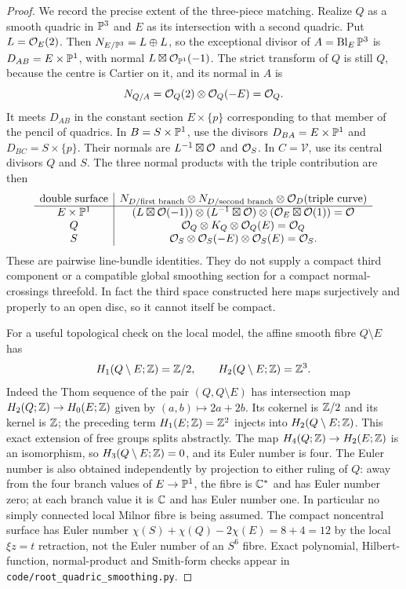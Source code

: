 \begin{proof}
We record the precise extent of the three-piece matching.
Realize $Q$ as a smooth quadric in $\mathbb P^3$ and $E$ as its
intersection with a second quadric.  Put $L=\mathcal O_E(2)$.
Then $N_{E/\mathbb P^3}=L\oplus L$, so the exceptional divisor
of $A=\operatorname{Bl}_E\mathbb P^3$ is
$D_{AB}=E\times\mathbb P^1$, with normal
$L\boxtimes\mathcal O_{\mathbb P^1}(-1)$.
The strict transform of $Q$ is still $Q$, because the centre is
Cartier on it, and its normal in $A$ is
\[
 N_{Q/A}=\mathcal O_Q(2)\otimes\mathcal O_Q(-E)=\mathcal O_Q.
\]
It meets $D_{AB}$ in the constant section $E\times\{p\}$
corresponding to that member of the pencil of quadrics.
In $B=S\times\mathbb P^1$, use the divisors
$D_{BA}=E\times\mathbb P^1$ and $D_{BC}=S\times\{p\}$.
Their normals are $L^{-1}\boxtimes\mathcal O$ and $\mathcal O_S$.
In $C=\mathcal V$, use its central divisors $Q$ and $S$.
The three normal products with the triple contribution are then
\[
\begin{array}{c|c}
 \text{double surface}&
 N_{D/\text{first branch}}\otimes
 N_{D/\text{second branch}}\otimes\mathcal O_D(\text{triple curve})\\ \hline
 E\times\mathbb P^1&
 (L\boxtimes\mathcal O(-1))\otimes(L^{-1}\boxtimes\mathcal O)
       \otimes(\mathcal O_E\boxtimes\mathcal O(1))=\mathcal O\\
 Q&\mathcal O_Q\otimes K_Q\otimes\mathcal O_Q(E)=\mathcal O_Q\\
 S&\mathcal O_S\otimes\mathcal O_S(-E)\otimes\mathcal O_S(E)=\mathcal O_S.
\end{array}
\]
These are pairwise line-bundle identities.  They do not supply
a compact third component or a compatible global smoothing
section for a compact normal-crossings threefold.
In fact the third space constructed here maps surjectively and
properly to an open disc, so it cannot itself be compact.

For a useful topological check on the local model,
the affine smooth fibre $Q\setminus E$ has
\[
 H_1(Q\setminus E;\mathbb Z)=\mathbb Z/2,\qquad
 H_2(Q\setminus E;\mathbb Z)=\mathbb Z^3.
\]
Indeed the Thom sequence of the pair $(Q,Q\setminus E)$ has
intersection map $H_2(Q;\mathbb Z)\to H_0(E;\mathbb Z)$ given by
$(a,b)\mapsto2a+2b$.  Its cokernel is $\mathbb Z/2$ and its
kernel is $\mathbb Z$; the preceding term $H_1(E;\mathbb Z)=\mathbb Z^2$
injects into $H_2(Q\setminus E;\mathbb Z)$.
This exact extension of free groups splits abstractly.
The map $H_4(Q;\mathbb Z)\to H_2(E;\mathbb Z)$ is an isomorphism,
so $H_3(Q\setminus E;\mathbb Z)=0$, and its Euler number is four.
The Euler number is also obtained independently by projection
to either ruling of $Q$: away from the four branch values of
$E\to\mathbb P^1$, the fibre is $\mathbb C^*$ and has Euler number zero;
at each branch value it is $\mathbb C$ and has Euler number one.
In particular no simply connected local Milnor fibre is being
assumed.  The compact noncentral surface has Euler number
$\chi(S)+\chi(Q)-2\chi(E)=8+4=12$ by the local
$\xi z=t$ retraction, not the Euler number of an $S^6$ fibre.
Exact polynomial, Hilbert-function, normal-product and Smith-form
checks appear in \texttt{code/root\_quadric\_smoothing.py}.
\end{proof}
